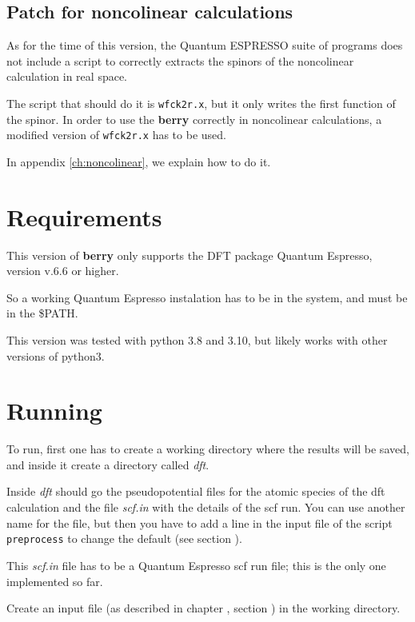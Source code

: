 \documentclass[a4paper,12pt]{report}
\begin{document}
\subsection{Patch for noncolinear calculations}

As for the time of this version, the {\sc Quantum ESPRESSO} suite of programs 
does not include a script to correctly extracts the spinors of the noncolinear calculation
in real space.

The script that should do it is \verb*|wfck2r.x|, but it only writes the first function of the spinor.
In order to use the \textbf{berry} correctly in noncolinear calculations, 
a modified version of \verb*|wfck2r.x| has to be used.

In appendix \ref{ch:noncolinear}, we explain how to do it.



\section{Requirements}

This version of \textbf{berry} only supports the DFT package {\sc Quantum Espresso}, version v.6.6 or higher.

So a working {\sc Quantum Espresso} instalation has to be in the system, and must be in the \$PATH.

This version was tested with python 3.8 and 3.10, but likely works with other versions of python3.


\section{Running}\label{sec:running}

 To run, first one has to create a working directory where the results will be saved,
 and inside it create a directory called \emph{dft}.

 Inside \emph{dft} should go the pseudopotential files for the atomic species of the dft calculation
and the file \emph{scf.in} with the details of the scf run.
You can use another name for the file, but then you have to add a line in the input file of
the script \texttt{preprocess} to change the default (see section ).


 This \emph{scf.in} file has to be a {\sc Quantum Espresso} scf run file;
 this is the only one implemented so far.

 Create an input file (as described in chapter , section )
 in the working directory.
\end{document}
